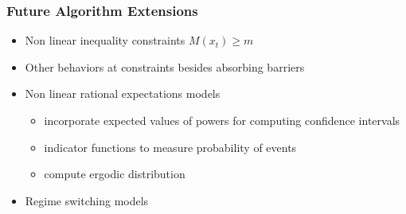 \documentclass{beamer}
\begin{document}
   \begin{frame}
     \frametitle{Future Algorithm Extensions}
     \begin{itemize}
     \item  Non linear inequality constraints $M(x_t) \ge m $
     \item Other behaviors at constraints besides absorbing barriers
\item Non linear rational expectations models
  \begin{itemize}
\item incorporate expected values of powers for computing confidence intervals 
\item indicator functions to measure probability of events
\item compute ergodic distribution
  \end{itemize}
\item Regime switching models
     \end{itemize}
   \end{frame}


\end{document}
